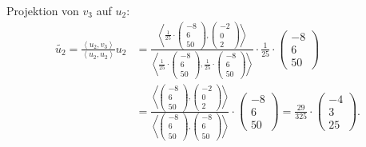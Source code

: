 \documentclass[german,12pt]{homework}
\newcommand{\dotproduct}[2]{\left\langle#1, #2\right\rangle}
\begin{document}
\begin{enumerate}
        Projektion von \(v_3\) auf \(u_2\):
        \begin{align*}
            \tilde{u_2} = \frac{\dotproduct{u_2}{v_3}}{\dotproduct{u_2}{u_2}}u_2 &= \frac{\dotproduct{\frac{1}{25} \cdot \begin{pmatrix}-8\\6\\50\end{pmatrix}}{\begin{pmatrix}-2\\0\\2\end{pmatrix}}}{\dotproduct{\frac{1}{25} \cdot \begin{pmatrix}-8\\6\\50\end{pmatrix}}{\frac{1}{25} \cdot \begin{pmatrix}-8\\6\\50\end{pmatrix}}} \cdot \frac{1}{25} \cdot \begin{pmatrix}-8\\6\\50\end{pmatrix}\\
            &= \frac{\dotproduct{\begin{pmatrix}-8\\6\\50\end{pmatrix}}{\begin{pmatrix}-2\\0\\2\end{pmatrix}}}{\dotproduct{\begin{pmatrix}-8\\6\\50\end{pmatrix}}{\begin{pmatrix}-8\\6\\50\end{pmatrix}}} \cdot \begin{pmatrix}-8\\6\\50\end{pmatrix} = \frac{29}{325} \cdot \begin{pmatrix}-4\\3\\25\end{pmatrix}.

\end{align*}
\end{enumerate}
\end{document}
